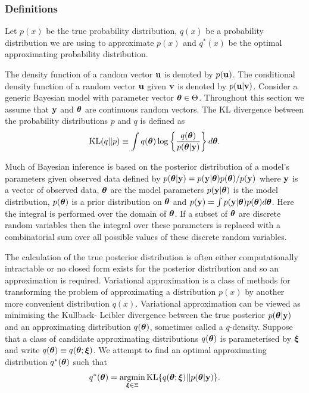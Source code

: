 \documentclass{amsart}[12pt]
\begin{document}
\subsubsection{Definitions}


Let $p(x)$ be the true probability distribution, $q(x)$ be a probability distribution we are using
to approximate $p(x)$ and $q^*(x)$ be the optimal approximating probability distribution.

The density function of a random vector ${\bf u}$ is denoted by $p({\bf u})$.  The conditional density function of a
random vector ${\bf u}$ given ${\bf v}$ is denoted by $p({\bf u}|{\bf v})$. Consider a generic Bayesian model with parameter
vector ${\boldsymbol \theta} \in \Theta$. Throughout this section we assume that ${\bf y}$ and ${\boldsymbol \theta}$ are continuous random
vectors. The KL divergence between the probability distributions $p$ and $q$ is defined as
\[
	\text{KL}(q || p) \equiv \int q({\boldsymbol \theta}) \log \left \{ \frac{q({\boldsymbol \theta})}{p({\boldsymbol \theta} | {\bf y})} \right \} d {\boldsymbol \theta}.
\]

Much of Bayesian inference is based on the posterior distribution of a model's parameters given observed data 
defined by $p({\boldsymbol \theta}|{\bf y}) = p({\bf y}|{\boldsymbol \theta})p({\boldsymbol \theta})/p({\bf y})$ where ${\bf y}$ is a vector of observed data,
${\boldsymbol \theta}$ are the model parameters $p({\bf y}|{\boldsymbol \theta})$ is the model distribution, $p({\boldsymbol \theta})$ is a prior 
distribution on ${\boldsymbol \theta}$ and $p({\bf y})=\int p({\bf y}|{\boldsymbol \theta})p({\boldsymbol \theta})d{\boldsymbol \theta}$. Here the integral is performed
over the domain of ${\boldsymbol \theta}$. If a subset of ${\boldsymbol \theta}$ are discrete random variables then the integral over
these parameters is replaced with a combinatorial sum over all possible values of these discrete random 
variables.

The calculation of the true posterior distribution is often either computationally intractable or no closed form
exists for the posterior distribution and so an approximation is required. Variational approximation is a
class of methods for transforming the problem of approximating a distribution $p(x)$ by another more
convenient distribution $q(x)$. Variational approximation can be viewed as minimising the Kullback- Leibler
divergence between the true posterior $p({\boldsymbol \theta}|{\bf y})$ and an approximating distribution $q({\boldsymbol \theta})$,
sometimes called a $q$-density. Suppose that a class of candidate approximating distributions
$q({\boldsymbol \theta})$ is parameterised by ${\boldsymbol \xi}$ and write $q({\boldsymbol \theta})\equiv q({\boldsymbol \theta};{\boldsymbol \xi})$. We attempt to find an 
optimal approximating distribution $q^*({\boldsymbol \theta})$ such that
\[
	\ds q^*(\vtheta) = \argmin_{\vxi \in \Xi} \text{KL} \{ {q(\vtheta;\vxi) || p(\vtheta|\vy)} \}.
\]
\end{document}
